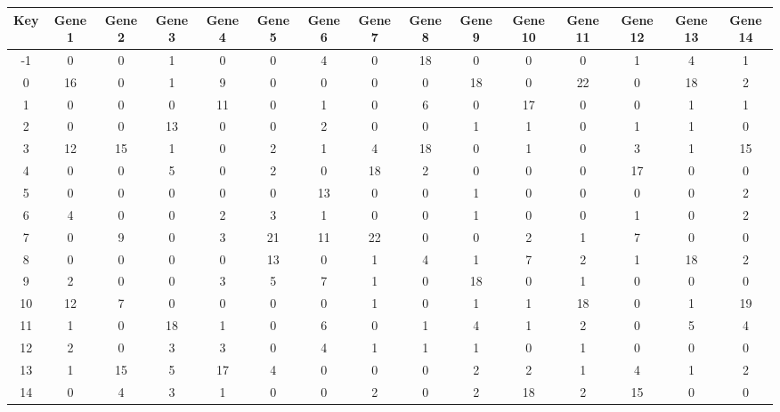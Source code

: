 \begin{tabular}{|c|c|c|c|c|c|c|c|c|c|c|c|c|c|c|}
\hline
Key & Gene 1 & Gene 2 & Gene 3 & Gene 4 & Gene 5 & Gene 6 & Gene 7 & Gene 8 & Gene 9 & Gene 10 & Gene 11 & Gene 12 & Gene 13 & Gene 14 \\
\hline
-1 & 0 & 0 & 1 & 0 & 0 & 4 & 0 & 18 & 0 & 0 & 0 & 1 & 4 & 1 \\
0 & 16 & 0 & 1 & 9 & 0 & 0 & 0 & 0 & 18 & 0 & 22 & 0 & 18 & 2 \\
1 & 0 & 0 & 0 & 11 & 0 & 1 & 0 & 6 & 0 & 17 & 0 & 0 & 1 & 1 \\
2 & 0 & 0 & 13 & 0 & 0 & 2 & 0 & 0 & 1 & 1 & 0 & 1 & 1 & 0 \\
3 & 12 & 15 & 1 & 0 & 2 & 1 & 4 & 18 & 0 & 1 & 0 & 3 & 1 & 15 \\
4 & 0 & 0 & 5 & 0 & 2 & 0 & 18 & 2 & 0 & 0 & 0 & 17 & 0 & 0 \\
5 & 0 & 0 & 0 & 0 & 0 & 13 & 0 & 0 & 1 & 0 & 0 & 0 & 0 & 2 \\
6 & 4 & 0 & 0 & 2 & 3 & 1 & 0 & 0 & 1 & 0 & 0 & 1 & 0 & 2 \\
7 & 0 & 9 & 0 & 3 & 21 & 11 & 22 & 0 & 0 & 2 & 1 & 7 & 0 & 0 \\
8 & 0 & 0 & 0 & 0 & 13 & 0 & 1 & 4 & 1 & 7 & 2 & 1 & 18 & 2 \\
9 & 2 & 0 & 0 & 3 & 5 & 7 & 1 & 0 & 18 & 0 & 1 & 0 & 0 & 0 \\
10 & 12 & 7 & 0 & 0 & 0 & 0 & 1 & 0 & 1 & 1 & 18 & 0 & 1 & 19 \\
11 & 1 & 0 & 18 & 1 & 0 & 6 & 0 & 1 & 4 & 1 & 2 & 0 & 5 & 4 \\
12 & 2 & 0 & 3 & 3 & 0 & 4 & 1 & 1 & 1 & 0 & 1 & 0 & 0 & 0 \\
13 & 1 & 15 & 5 & 17 & 4 & 0 & 0 & 0 & 2 & 2 & 1 & 4 & 1 & 2 \\
14 & 0 & 4 & 3 & 1 & 0 & 0 & 2 & 0 & 2 & 18 & 2 & 15 & 0 & 0 \\
\hline
\end{tabular}